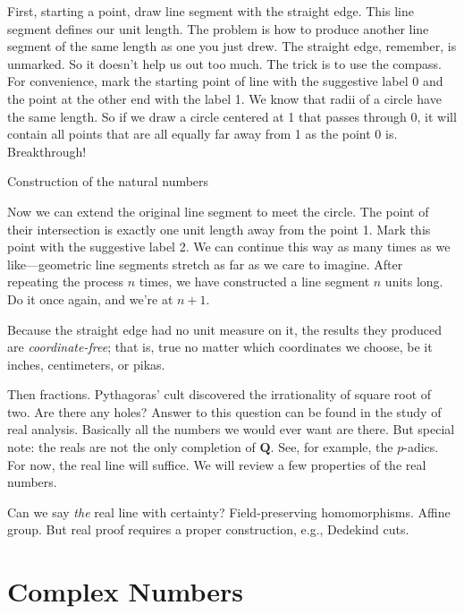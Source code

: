 First, starting a point, draw line segment with the straight edge. This line segment defines our unit length. The problem is how to produce another line segment of the same length as one you just drew. The straight edge, remember, is unmarked. So it doesn't help us out too much. The trick is to use the compass. For convenience, mark the starting point of line with the suggestive label \textsf{0} and the point at the other end with the label \textsf{1}. We know that radii of a circle have the same length. So if we draw a circle centered at \textsf{1} that passes through \textsf{0}, it will contain all points that are all equally far away from \textsf{1} as the point \textsf{0} is. Breakthrough!

\begin{marginfigure}
  
  \caption{\label{fig:mb-natural-numbers-construction} Construction of the natural numbers}
\end{marginfigure}

Now we can extend the original line segment to meet the circle. The point of their intersection is exactly one unit length away from the point \textsf{1}. Mark this point with the suggestive label \textsf{2}. We can continue this way as many times as we like---geometric line segments stretch as far as we care to imagine. After repeating the process $n$ times, we have constructed a line segment $n$ units long. Do it once again, and we're at $n+1$.

Because the straight edge had no unit measure on it, the results they produced are \emph{coordinate-free}; that is, true no matter which coordinates we choose, be it inches, centimeters, or pikas.

Then fractions. Pythagoras' cult discovered the irrationality of square root of two. Are there any holes? Answer to this question can be found in the study of real analysis. Basically all the numbers we would ever want are there. But special note: the reals are not the only completion of $\mathbf{Q}$. See, for example, the $p$-adics. For now, the real line will suffice.  We will review a few properties of the real numbers.

Can we say \emph{the} real line with certainty? Field-preserving homomorphisms. Affine group. But real proof requires a proper construction, e.g., Dedekind cuts.


\section{Complex Numbers}

